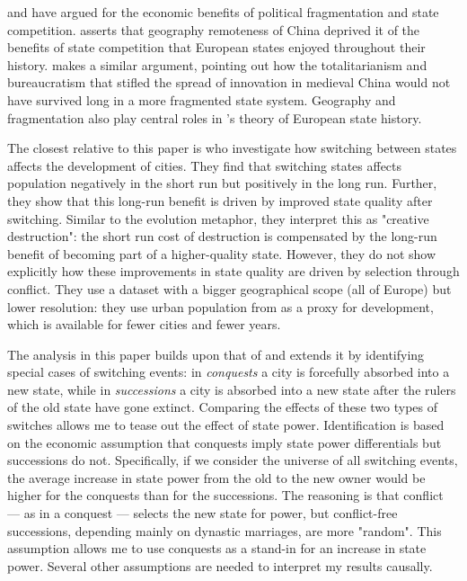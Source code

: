 \documentclass[11pt, a4paper]{article}
\begin{document}
\cite{diamond1997} and \cite{landes1969, landes2006} have argued for the economic benefits of political fragmentation and state competition. \cite{diamond1997} asserts that geography 
remoteness of China deprived it of the benefits of state competition that European states enjoyed throughout their history. \cite{landes2006} makes a similar argument, pointing out how the totalitarianism and bureaucratism that stifled the spread of innovation in medieval China would not have survived long in a more fragmented state system. Geography and fragmentation also play central roles in \cite{cervellati2022}'s theory of European state history.

The closest relative to this paper is \cite{schoenholzer2022} who investigate how switching between states affects the development of cities. They find that switching states affects population negatively in the short run but positively in the long run. Further, they show that this long-run benefit is driven by improved state quality after switching. Similar to the evolution metaphor, they interpret this as "creative destruction": the short run cost of destruction is compensated by the long-run benefit of becoming part of a higher-quality state. However, they do not show explicitly how these improvements in state quality are driven by selection through conflict. They use a dataset with a bigger geographical scope (all of Europe) but lower resolution: they use urban population from \cite{bairoch1988} as a proxy for development, which is available for fewer cities and fewer years.

The analysis in this paper builds upon that of \cite{schoenholzer2022} and extends it by identifying special cases of switching events: in \textit{conquests} a city is forcefully absorbed into a new state, while in \textit{successions} a city is absorbed into a new state after the rulers of the old state have gone extinct. Comparing the effects of these two types of switches allows me to tease out the effect of state power. Identification is based on the economic assumption that conquests imply state power differentials but successions do not. Specifically, if we consider the universe of all switching events, the average increase in state power from the old to the new owner would be higher for the conquests than for the successions. The reasoning is that conflict --- as in a conquest --- selects the new state for power, but conflict-free successions, depending mainly on dynastic marriages, are more "random". This assumption allows me to use conquests as a stand-in for an increase in state power. Several other assumptions are needed to interpret my results causally.
\end{document}

